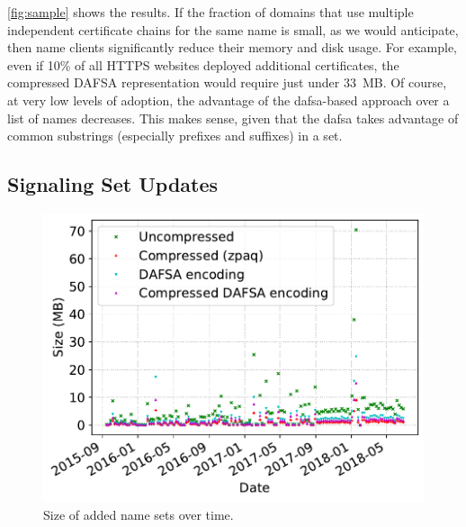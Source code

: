 \autoref{fig:sample} shows the results. If the fraction of domains that use
multiple independent certificate chains for the same name is small, as we would
anticipate, then \ac{name} clients significantly reduce their memory and disk
usage. For example, even if 10\% of all HTTPS websites deployed additional
certificates, the compressed DAFSA representation would require just under
33~MB. Of course, at very low levels of adoption, the advantage of the
\ac{dafsa}-based approach over a list of names decreases. This makes sense,
given that the \ac{dafsa} takes advantage of common substrings (especially
prefixes and suffixes) in a set.

\subsection{Signaling Set Updates}
\label{sec:evaluation:updates}


\begin{figure}[t]
  \centering
  \includegraphics[width=\linewidth]{fig/added_name_set_size}
  \caption{Size of added name sets over time.}
  \label{fig:updates:added}
\end{figure}

